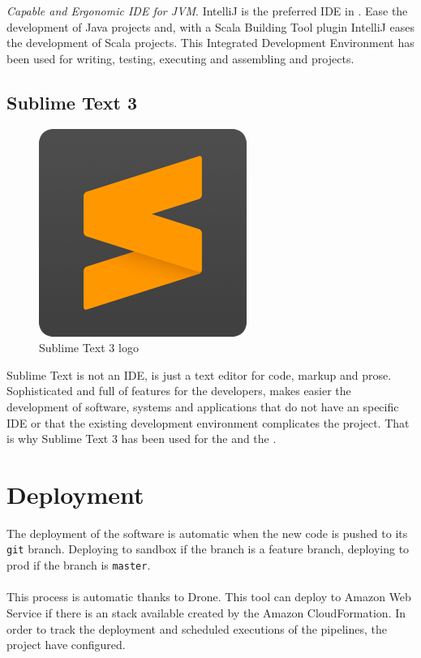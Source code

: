 \textit{Capable and Ergonomic IDE for JVM}. IntelliJ is the preferred IDE\cite{ide} in \company. Ease the development of Java projects and, with a Scala Building Tool plugin IntelliJ eases the development of Scala projects. This Integrated Development Environment has been used for writing, testing, executing and assembling  and  projects.

\subsection*{Sublime Text 3\cite{sublimetext}}

\begin{figure}[H]
\centering
\includegraphics[scale=0.1]{resources/sublime-logo.png}
\caption{Sublime Text 3 logo}
\end{figure}

Sublime Text is not an IDE, is just a text editor for code, markup and prose. Sophisticated and full of features for the developers, makes easier the development of software, systems and applications that do not have an specific IDE or that the existing development environment complicates the project. That is why Sublime Text 3 has been used for the  and the .

\section{Deployment}

The deployment of the software is automatic when the new code is pushed to its \texttt{git} branch. Deploying to sandbox if the branch is a feature branch, deploying to prod if the branch is \texttt{master}.
\\\\
This process is automatic thanks to Drone. This tool can deploy to Amazon Web Service if there is an stack available created by the Amazon CloudFormation. In order to track the deployment and scheduled executions of the pipelines, the project have  configured.

